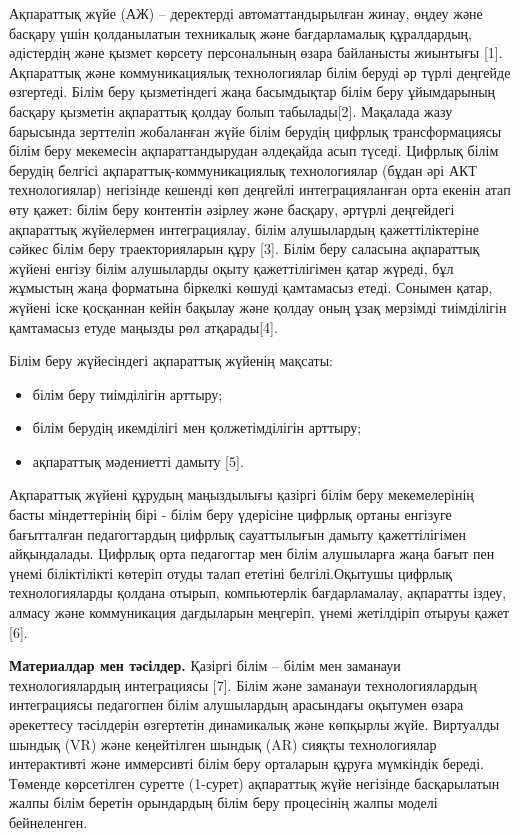 \begin{multicols}{2}
Ақпараттық жүйе (АЖ) -- деректерді автоматтандырылған жинау, өңдеу және
басқару үшін қолданылатын техникалық және бағдарламалық құралдардың,
әдістердің және қызмет көрсету персоналының өзара байланысты жиынтығы
{[}1{]}. Ақпараттық және коммуникациялық технологиялар білім беруді әр
түрлі деңгейде өзгертеді. Білім беру қызметіндегі жаңа басымдықтар білім
беру ұйымдарының басқару қызметін ақпараттық қолдау болып
табылады{[}2{]}. Мақалада жазу барысында зерттеліп жобаланған жүйе білім
берудің цифрлық трансформациясы білім беру мекемесін ақпараттандырудан
әлдеқайда асып түседі. Цифрлық білім берудің белгісі
ақпараттық-коммуникациялық технологиялар (бұдан әрі АКТ технологиялар)
негізінде кешенді көп деңгейлі интеграцияланған орта екенін атап өту
қажет: білім беру контентін әзірлеу және басқару, әртүрлі деңгейдегі
ақпараттық жүйелермен интеграциялау, білім алушылардың қажеттіліктеріне
сәйкес білім беру траекторияларын құру {[}3{]}. Білім беру саласына
ақпараттық жүйені енгізу білім алушыларды оқыту қажеттілігімен қатар
жүреді, бұл жұмыстың жаңа форматына біркелкі көшуді қамтамасыз етеді.
Сонымен қатар, жүйені іске қосқаннан кейін бақылау және қолдау оның ұзақ
мерзімді тиімділігін қамтамасыз етуде маңызды рөл атқарады{[}4{]}.

Білім беру жүйесіндегі ақпараттық жүйенің мақсаты:

\begin{itemize}
\item
  білім беру тиімділігін арттыру;
\item
  білім берудің икемділігі мен қолжетімділігін арттыру;
\item
  ақпараттық мәдениетті дамыту {[}5{]}.
\end{itemize}

Ақпараттық жүйені құрудың маңыздылығы қазіргі білім беру мекемелерінің
басты міндеттерінің бірі - білім беру үдерісіне цифрлық ортаны енгізуге
бағытталған педагогтардың цифрлық сауаттылығын дамыту қажеттілігімен
айқындалады. Цифрлық орта педагогтар мен білім алушыларға жаңа бағыт пен
үнемі біліктілікті көтеріп отуды талап ететіні белгілі.Оқытушы цифрлық
технологияларды қолдана отырып, компьютерлік бағдарламалау, ақпаратты
іздеу, алмасу және коммуникация дағдыларын меңгеріп, үнемі жетілдіріп
отыруы қажет {[}6{]}.

{\bfseries Материалдар мен тәсілдер.} Қазіргі білім -- білім мен заманауи
технологиялардың интеграциясы {[}7{]}. Білім және заманауи
технологиялардың интеграциясы педагогпен білім алушылардың арасындағы
оқытумен өзара әрекеттесу тәсілдерін өзгертетін динамикалық және
көпқырлы жүйе. Виртуалды шындық (VR) және кеңейтілген шындық (AR) сияқты
технологиялар интерактивті және иммерсивті білім беру орталарын құруға
мүмкіндік береді. Төменде көрсетілген суретте (1-сурет) ақпараттық жүйе
негізінде басқарылатын жалпы білім беретін орындардың білім беру
процесінің жалпы моделі бейнеленген.
\end{multicols}

